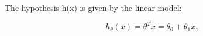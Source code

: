 \documentclass{article}
\begin{document}
{\Large



The hypothesis h(x) is given by the linear model: 

\begin{equation}
  h_\theta{(x)} = \theta^Tx = \theta_0 + \theta_1{x_1}
\end{equation}

}
\end{document}
